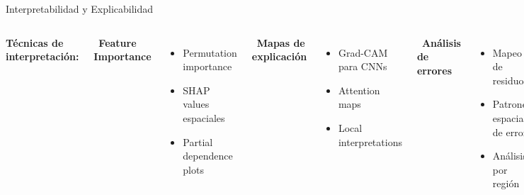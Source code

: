 \documentclass[10pt,aspectratio=169]{beamer}
\begin{document}
\begin{frame}{Interpretabilidad y Explicabilidad}
    \begin{columns}
        \textbf{Técnicas de interpretación:}

        \vspace{2mm}
        \faChartLine\ \textbf{Feature Importance}
        \begin{itemize}
            \item Permutation importance
            \item SHAP values espaciales
            \item Partial dependence plots
        \end{itemize}

        \vspace{2mm}
        \faMap\ \textbf{Mapas de explicación}
        \begin{itemize}
            \item Grad-CAM para CNNs
            \item Attention maps
            \item Local interpretations
        \end{itemize}

        \vspace{2mm}
        \faSearch\ \textbf{Análisis de errores}
        \begin{itemize}
            \item Mapeo de residuos
            \item Patrones espaciales de error
            \item Análisis por región
        \end{itemize}

    \end{columns}
\end{frame}
\end{document}
